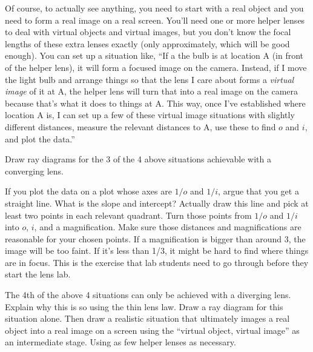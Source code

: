 \documentclass[11pt]{hmcpset}
\begin{document}
\begin{problem}
\vspace{1em}
Of course, to actually see anything, you need to start with a real object and you need to form a real image on a real screen. You'll need one or more helper lenses to deal with virtual objects and virtual images, but you don't know the focal lengths of these extra lenses exactly (only approximately, which will be good enough). You can set up a situation like, ``If a the bulb is at location A (in front of the helper lens), it will form a focused image on the camera. Instead, if I move the light bulb and arrange things so that the lens I care about forms a \textit{virtual image} of it at A, the helper lens will turn that into a real image on the camera because that's what it does to things at A. This way, once I've established where location A is, I can set up a few of these virtual image situations with slightly different distances, measure the relevant distances to A, use these to find $o$ and $i$, and plot the data.''

\vspace{1em}
Draw ray diagrams for the 3 of the 4 above situations achievable with a converging lens.

\vspace{1em}
If you plot the data on a plot whose axes are $1/o$ and $1/i$, argue that you get a straight line. What is the slope and intercept? Actually draw this line and pick at least two points in each relevant quadrant. Turn those points from $1/o$ and $1/i$ into $o$, $i$, and a magnification. Make sure those distances and magnifications are reasonable for your chosen points. If a magnification is bigger than around 3, the image will be too faint. If it's less than 1/3, it might be hard to find where things are in focus. This is the exercise that lab students need to go through before they start the lens lab.

The 4th of the above 4 situations can only be achieved with a diverging lens. Explain why this is so using the thin lens law. Draw a ray diagram for this situation alone. Then draw a realistic situation that ultimately images a real object into a real image on a screen using the ``virtual object, virtual image'' as an intermediate stage. Using as few helper lenses as necessary. 

\end{problem}

\begin{solution}
	
	\vfill
	
\end{solution}

\pagebreak
\end{document}
